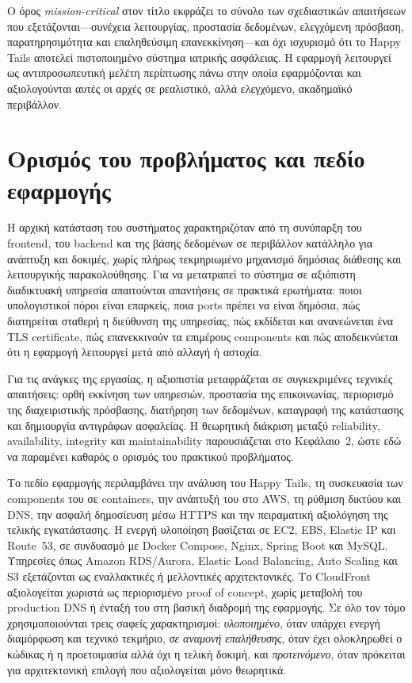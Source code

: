 Ο όρος \emph{mission-critical} στον τίτλο εκφράζει το σύνολο των
σχεδιαστικών απαιτήσεων που εξετάζονται---συνέχεια λειτουργίας, προστασία
δεδομένων, ελεγχόμενη πρόσβαση, παρατηρησιμότητα και επαληθεύσιμη
επανεκκίνηση---και όχι ισχυρισμό ότι το Happy Tails αποτελεί πιστοποιημένο
σύστημα ιατρικής ασφάλειας. Η εφαρμογή λειτουργεί ως αντιπροσωπευτική
μελέτη περίπτωσης πάνω στην οποία εφαρμόζονται και αξιολογούνται αυτές οι
αρχές σε ρεαλιστικό, αλλά ελεγχόμενο, ακαδημαϊκό περιβάλλον.

\section{Ορισμός του προβλήματος και πεδίο εφαρμογής}
Η αρχική κατάσταση του συστήματος χαρακτηριζόταν από τη συνύπαρξη του
frontend, του backend και της βάσης δεδομένων σε περιβάλλον κατάλληλο για
ανάπτυξη και δοκιμές, χωρίς πλήρως τεκμηριωμένο μηχανισμό δημόσιας διάθεσης
και λειτουργικής παρακολούθησης. Για να μετατραπεί το σύστημα σε αξιόπιστη
διαδικτυακή υπηρεσία απαιτούνται απαντήσεις σε πρακτικά ερωτήματα: ποιοι
υπολογιστικοί πόροι είναι επαρκείς, ποια ports πρέπει να είναι δημόσια,
πώς διατηρείται σταθερή η διεύθυνση της υπηρεσίας, πώς εκδίδεται και
ανανεώνεται ένα TLS certificate, πώς επανεκκινούν τα επιμέρους components
και πώς αποδεικνύεται ότι η εφαρμογή λειτουργεί μετά από αλλαγή ή αστοχία.

Για τις ανάγκες της εργασίας, η αξιοπιστία μεταφράζεται σε συγκεκριμένες
τεχνικές απαιτήσεις: ορθή εκκίνηση των υπηρεσιών, προστασία της επικοινωνίας,
περιορισμό της διαχειριστικής πρόσβασης, διατήρηση των δεδομένων, καταγραφή
της κατάστασης και δημιουργία αντιγράφων ασφαλείας. Η θεωρητική διάκριση
μεταξύ reliability, availability, integrity και maintainability παρουσιάζεται
στο Κεφάλαιο~2, ώστε εδώ να παραμένει καθαρός ο ορισμός του πρακτικού
προβλήματος.

Το πεδίο εφαρμογής περιλαμβάνει την ανάλυση του Happy Tails, τη συσκευασία
των components του σε containers, την ανάπτυξή του στο AWS, τη ρύθμιση
δικτύου και DNS, την ασφαλή δημοσίευση μέσω HTTPS και την πειραματική
αξιολόγηση της τελικής εγκατάστασης. Η ενεργή υλοποίηση βασίζεται σε EC2,
EBS, Elastic IP και Route~53, σε συνδυασμό με Docker Compose, Nginx, Spring
Boot και MySQL. Υπηρεσίες όπως Amazon RDS/Aurora, Elastic Load Balancing,
Auto Scaling και S3 εξετάζονται ως εναλλακτικές ή μελλοντικές
αρχιτεκτονικές. Το CloudFront αξιολογείται χωριστά ως περιορισμένο proof of
concept, χωρίς μεταβολή του production DNS ή ένταξή του στη βασική διαδρομή
της εφαρμογής.
Σε όλο τον τόμο χρησιμοποιούνται τρεις σαφείς χαρακτηρισμοί:
\emph{υλοποιημένο}, όταν υπάρχει ενεργή διαμόρφωση και τεχνικό τεκμήριο,
\emph{σε αναμονή επαλήθευσης}, όταν έχει ολοκληρωθεί ο κώδικας ή η προετοιμασία
αλλά όχι η τελική δοκιμή, και \emph{προτεινόμενο}, όταν πρόκειται για
αρχιτεκτονική επιλογή που αξιολογείται μόνο θεωρητικά.

